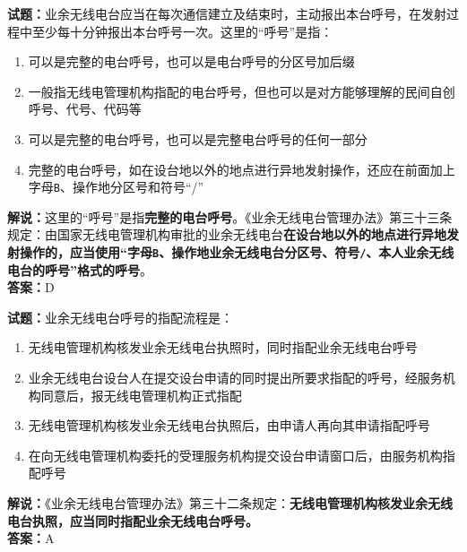 \documentclass{ctexbook}
\begin{document}
\vspace{\baselineskip}

\noindent\textbf{试题：}业余无线电台应当在每次通信建立及结束时，主动报出本台呼号，在发射过程中至少每十分钟报出本台呼号一次。这里的“呼号”是指：
\begin{enumerate}[leftmargin=3em]
  \item 可以是完整的电台呼号，也可以是电台呼号的分区号加后缀
  \item 一般指无线电管理机构指配的电台呼号，但也可以是对方能够理解的民间自创呼号、代号、代码等
  \item 可以是完整的电台呼号，也可以是完整电台呼号的任何一部分
  \item 完整的电台呼号，如在设台地以外的地点进行异地发射操作，还应在前面加上字母\texttt{B}、操作地分区号和符号“/”
\end{enumerate}
\noindent\textbf{解说：}这里的“呼号”是指\textbf{完整的电台呼号}。《业余无线电台管理办法》第三十三条规定：由国家无线电管理机构审批的业余无线电台\textbf{在设台地以外的地点进行异地发射操作的，应当使用“字母\texttt{B}、操作地业余无线电台分区号、符号\texttt{/}、本人业余无线电台的呼号”格式的呼号}。\\\noindent\textbf{答案：}D

\vspace{\baselineskip}

\noindent\textbf{试题：}业余无线电台呼号的指配流程是：
\begin{enumerate}[leftmargin=3em]
  \item 无线电管理机构核发业余无线电台执照时，同时指配业余无线电台呼号
  \item 业余无线电台设台人在提交设台申请的同时提出所要求指配的呼号，经服务机构同意后，报无线电管理机构正式指配
  \item 无线电管理机构核发业余无线电台执照后，由申请人再向其申请指配呼号
  \item 在向无线电管理机构委托的受理服务机构提交设台申请窗口后，由服务机构指配呼号
\end{enumerate}
\noindent\textbf{解说：}《业余无线电台管理办法》第三十二条规定：\textbf{无线电管理机构核发业余无线电台执照，应当同时指配业余无线电台呼号。}\\\noindent\textbf{答案：}A

\vspace{\baselineskip}
\end{document}
